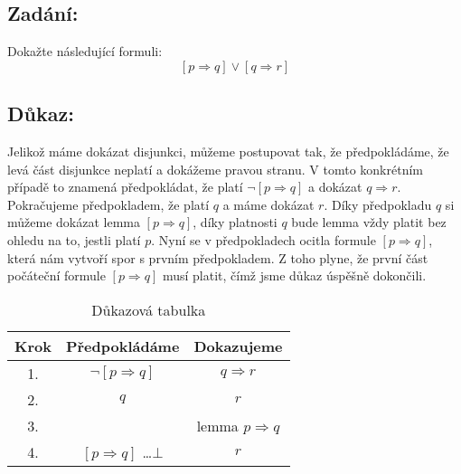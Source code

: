 \documentclass{article}
\begin{document}
\subsection{Zadání:}

Dokažte následující formuli:
$$[p \Rightarrow q] \lor [q \Rightarrow r]$$

\subsection{Důkaz:}

Jelikož máme dokázat disjunkci, můžeme postupovat tak, že předpokládáme, že levá část disjunkce neplatí a dokážeme pravou stranu. V tomto konkrétním případě to znamená předpokládat, že platí $\neg [p \Rightarrow q]$ a dokázat $q \Rightarrow r$. Pokračujeme předpokladem, že platí $q$ a máme dokázat $r$. Díky předpokladu $q$ si můžeme dokázat lemma $[p \Rightarrow q]$, díky platnosti $q$ bude lemma vždy platit bez ohledu na to, jestli platí $p$. Nyní se v předpokladech ocitla formule $[p \Rightarrow q]$, která nám vytvoří spor s prvním předpokladem. Z toho plyne, že první část počáteční formule $[p \Rightarrow q]$ musí platit, čímž jsme důkaz úspěšně dokončili.

\begin{table}[H]\centering

    \caption{Důkazová tabulka}

\begin{tabular}{|c|c|c|}
    
    
        \hline \textbf{Krok} & \textbf{Předpokládáme} & \textbf{Dokazujeme} \\ \hline \hline
    	1. & $\neg [p \Rightarrow q]$  & $q \Rightarrow r$ \\ \hline
    	2. & $q$  & $r$ \\ \hline
    	3. &   & lemma $p \Rightarrow q$ \\ \hline
    	4. & $[p \Rightarrow q]$ \dots $\bot$  & $r$ \\ \hline
            
    	\end{tabular}
\end{table}
\end{document}
